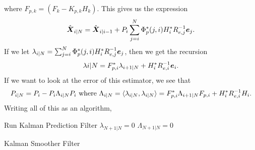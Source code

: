 where $F_{p,k} = (F_k - K_{p, k}H_k)$.
This gives us the expression \[
	\hat{\boldsymbol{X}}_{i|N} = \hat{\boldsymbol{X}}_{i|i-1} + P_i \sum_{j=i}^N \Phi_p^*(j, i)H_i^*R_{e,j}^{-1}\boldsymbol{e}_j.
\]
If we let $\lambda_{i|N} = \sum_{j=i}^N \Phi_p^*(j, i)H_i^*R_{e,j}^{-1}\boldsymbol{e}_j$, then we get the recursion
\[
	\lambda{i|N} = F_{p,i}^*\lambda_{i+1|N} + H_i^*R_{e, i}^{-1}\boldsymbol{e}_i.
\]
If we want to look at the error of this estimator, we see that \[
	P_{i|N} = P_i - P_i \Lambda_{i|N} P_i \text{ where } \Lambda_{i|N} = \langle \lambda_{i|N}, \lambda_{i|N} \rangle = F_{p,i}^*\Lambda_{i+1|N}F_{p,i}+H_i^*R_{e, i}^{-1}H_i.
\]
Writing all of this as an algorithm,

\begin{algorithm}[H]
	\SetAlgoLined
	Run Kalman Prediction Filter\;
	$\lambda_{N+1|N} = 0$\;
	$\Lambda_{N+1|N} = 0$\;
	\caption{Kalman Smoother Filter}
\end{algorithm}


